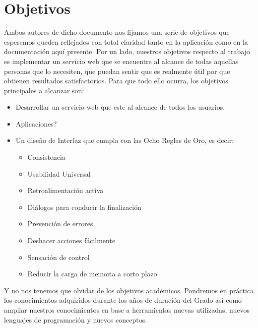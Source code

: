 \section{Objetivos}
Ambos autores de dicho documento nos fijamos una serie de objetivos que esperemos queden reflejados con total claridad tanto en la aplicación como en la documentación aquí presente.
Por un lado, nuestros objetivos respecto al trabajo es implementar un servicio web  que se encuentre al alcance de todas aquellas personas que lo necesiten, que puedan sentir que es realmente útil por que obtienen resultados satisfactorios.
Para que todo ello ocurra, los objetivos principales a alcanzar son:
\begin{itemize}
	\item Desarrollar un servicio web que este al alcance de todos los usuarios.	
	\item Aplicaciones?
	\item Un diseño de Interfaz que cumpla con las Ocho Reglas de Oro, es decir: 
	\begin{itemize}
		\item Consistencia
		\item Usabilidad Universal
		\item Retroalimentación activa
		\item Diálogos para conducir la finalización
		\item Prevención de errores
		\item Deshacer acciones fácilmente
		\item Sensación de control
		\item Reducir la carga de memoria a corto plazo
	\end{itemize}
\end{itemize}
Y no nos tenemos que olvidar de los objetivos académicos. Pondremos en práctica los conocimientos adquiridos durante los años de duración del Grado así como ampliar nuestros conocimientos en base a herramientas nuevas utilizadas, nuevos lenguajes de programación y nuevos conceptos.







